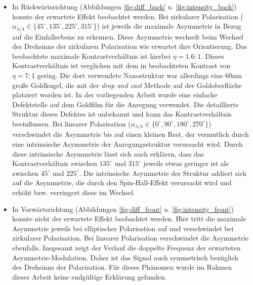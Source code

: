 \documentclass[titlepage,  ngerman]{article}
\begin{document}
		\begin{itemize}
			\item In Rückwärtsrichtung (Abbildungen \ref{fig:diff_back} u. \ref{fig:intensity_back}) konnte der erwartete Effekt beobachtet werden. Bei zirkularer Polarisation ($\alpha_{\lambda/4} \in \{45^\circ, 135^\circ, 225^\circ, 315^\circ\}$) ist jeweils die maximale Asymmetrie in Bezug auf die Einfallsebene zu erkennen. Diese Asymmetrie wechselt beim Wechsel des Drehsinns der zirkularen Polarisation wie erwartet ihre Orientierung. Das beobachtete maximale Kontrastverhältnis ist hierbei $\eta = 1.6:1$. Dieses Kontrastverhältnis ist verglichen mit dem in \cite{OConnor.2014} beobachteten Kontrast von $\eta =7:1$ gering.  Die dort verwendete Nanostruktur war allerdings eine  $60\mathrm{nm}$ große Goldkugel, die mit der \textit{drop and cast} Methode auf der Goldoberfläche platziert worden ist. In der vorliegenden Arbeit wurde eine einfache Defektstelle auf dem Goldfilm für die Anregung verwendet. Die detaillierte Struktur dieses Defektes ist unbekannt und kann das Kontrastverhältnis beeinflussen.  Bei linearer Polarisation ($\alpha_{\lambda/4} \in \{0^\circ, 90^\circ, 180^\circ, 270^\circ\}$) verschwindet die Asymmetrie bis auf einen kleinen Rest, der vermutlich durch eine intrinsische Asymmetrie der Anregungsstruktur verursacht wird. Durch diese intrinsische Asymmetrie lässt sich auch erklären, dass das Kontrastverhältnis zwischen $135^\circ$ und $ 315^\circ$ jeweils etwas geringer ist als zwischen $45^\circ$ und $225^\circ$.
			Die intrinsische Asymmetrie der Struktur addiert sich auf die Asymmetrie, die durch den Spin-Hall-Effekt verursacht wird und erhöht bzw. verringert diese im Wechsel.
			\item In Vorwärtsrichtung (Abbildungen \ref{fig:diff_front} u. \ref{fig:intensity_front}) konnte nicht der erwartete Effekt beobachtet werden. Hier tritt die maximale Asymmetrie jeweils bei elliptischer Polarisation auf und verschwindet bei zirkularer Polarisation. Bei linearer Polarisation verschwindet die Asymmetrie ebenfalls. Insgesamt zeigt der Verlauf die doppelte Frequenz der erwarteten Asymmetrie-Modulation. Daher ist das Signal auch symmetrisch bezüglich des Drehsinns der Polarisation. Für dieses Phänomen wurde im Rahmen dieser Arbeit keine endgültige Erklärung gefunden.
			

\end{itemize}
\end{document}

